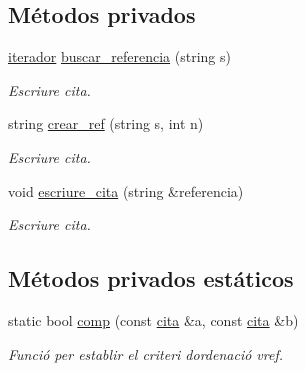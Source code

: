 \subsection*{Métodos privados}
\begin{DoxyCompactItemize}
\item 
\hyperlink{class_cites_ae425e520dfe8c7271cb7465f450e8824}{iterador} \hyperlink{class_cites_af079658fd57e9d9af357c2d4fbea5e52}{buscar\+\_\+referencia} (string s)
\begin{DoxyCompactList}\small\item\em Escriure cita. \end{DoxyCompactList}\item 
string \hyperlink{class_cites_a0a9c4b06356f7c7f6728224abd8ee5d4}{crear\+\_\+ref} (string s, int n)
\begin{DoxyCompactList}\small\item\em Escriure cita. \end{DoxyCompactList}\item 
void \hyperlink{class_cites_a959b95c1e881ae212828771c2c876515}{escriure\+\_\+cita} (string \&referencia)
\begin{DoxyCompactList}\small\item\em Escriure cita. \end{DoxyCompactList}\end{DoxyCompactItemize}
\subsection*{Métodos privados estáticos}
\begin{DoxyCompactItemize}
\item 
static bool \hyperlink{class_cites_a071081d2ce9dd10f701af8f67409e78f}{comp} (const \hyperlink{struct_cites_1_1cita}{cita} \&a, const \hyperlink{struct_cites_1_1cita}{cita} \&b)
\begin{DoxyCompactList}\small\item\em Funció per establir el criteri d\textquotesingle{}ordenació vref. \end{DoxyCompactList}\end{DoxyCompactItemize}
